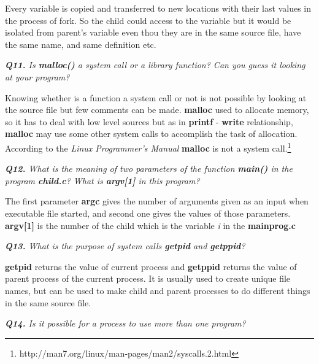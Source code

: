 \documentclass[11pt]{article}
\begin{document}
Every variable is copied and transferred to new locations with their last values in the process of fork. So the child could access to the variable but it would be isolated from parent's variable even thou they are in the same source file, have the same name, and same definition etc.

\vspace{5mm}

\textit{\textbf{Q11.} Is \textbf{malloc()} a system call or a library function? Can you guess it looking at your program?}
\vspace{5mm}

Knowing whether is a function a system call or not is not possible by looking at the source file but few comments can be made.
\textbf{malloc} used to allocate memory, so it has to deal with low level sources but as in \textbf{printf} - \textbf{write} relationship, \textbf{malloc} may use some other system calls to accomplish the task of allocation.
According to the \textit{Linux Programmer's Manual} \textbf{malloc} is not a system call.\footnote{http://man7.org/linux/man-pages/man2/syscalls.2.html}

\vspace{5mm}
\textit{\textbf{Q12.} What is the meaning of two parameters of the function \textbf{main()} in the program \textbf{child.c}? What is \textbf{argv[1]} in this program?}
\vspace{5mm}

The first parameter \textbf{argc} gives the number of arguments given as an input when executable file started, and second one gives the values of those parameters. 
\textbf{argv[1]} is the number of the child which is the variable \textit{i} in the \textbf{mainprog.c}

\vspace{5mm}
\textit{\textbf{Q13.} What is the purpose of system calls \textbf{getpid} and \textbf{getppid}?}
\vspace{5mm}

 \textbf{getpid} returns the value of current process and  \textbf{getppid} returns the value of parent process of the current process. It is usually used to create unique file names, but can be used to make child and parent processes to do different things in the same source file.
 
\vspace{5mm}
\textit{\textbf{Q14.} Is it possible for a process to use more than one program?}
\vspace{5mm}
\end{document}
